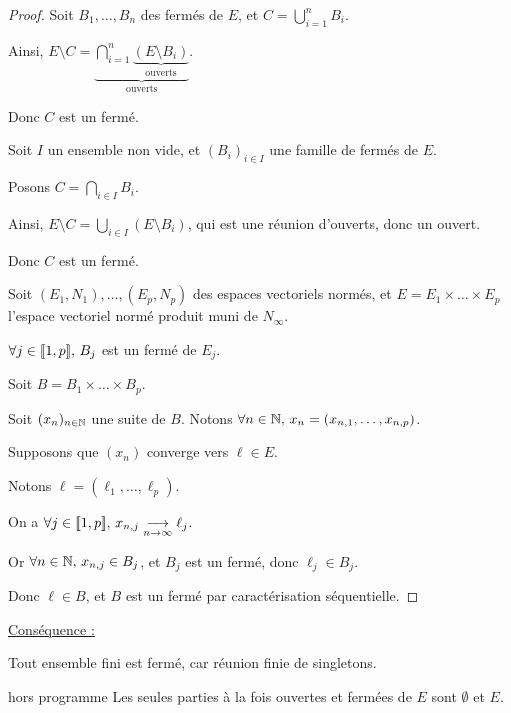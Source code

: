 \begin{proof}
    Soit $B_1, \dots, B_n$ des fermés de $E$, et $\displaystyle C = \bigcup_{i=1}^n B_i$.

    Ainsi, $E \setminus C = \underbrace{\bigcap_{i=1}^n \underbrace{(E \setminus B_i)}_{\text{ouverts}}}_{\text{ouverts}}$.

    Donc $C$ est un fermé.

    \lvspace Soit $I$ un ensemble non vide, et $(B_i)_{i \in I}$ une famille de fermés de $E$.

    Posons $\displaystyle C = \bigcap_{i \in I} B_i$.

    Ainsi, $\displaystyle E \setminus C = \bigcup_{i \in I} (E \setminus B_i)$, qui est une réunion d'ouverts, donc un ouvert.

    Donc $C$ est un fermé.

    \lvspace Soit $(E_1, N_1), \dots, (E_p, N_p)$ des espaces vectoriels normés, et
    $E = E_1 \times \dots \times E_p$ l'espace vectoriel normé produit muni de $N_\infty$.

    $\forall j \in [\![1, p]\!], \, B_j$ est un fermé de $E_j$.

    Soit $B = B_1 \times \dots \times B_p$. 

    Soit $(x_n)_{n \in \mathbb{N}}$ une suite de $B$. Notons $\forall n \in \mathbb{N}, \, x_n = (x_{n, 1}, \dots, x_{n, p})$.

    Supposons que $(x_n)$ converge vers $\ell \in E$. 

    Notons $\ell = (\ell_1, \dots, \ell_p)$.

    On a $\forall j \in [\![1, p]\!], \, x_{n, j} \underset{n \to \infty}{\longrightarrow} \ell_j$.

    Or $\forall n \in \mathbb{N}, \, x_{n, j} \in B_j$, et $B_j$ est un fermé, donc $\ell_j \in B_j$.

    Donc $\ell \in B$, et $B$ est un fermé par caractérisation séquentielle.

\end{proof}


\qquad \uline{Conséquence : }

\svspace Tout ensemble fini est fermé, car réunion finie de singletons.

\begin{theoreme}{hors programme}{}
    Les seules parties à la fois ouvertes et fermées de $E$ sont $\emptyset$ et $E$.
\end{theoreme}


